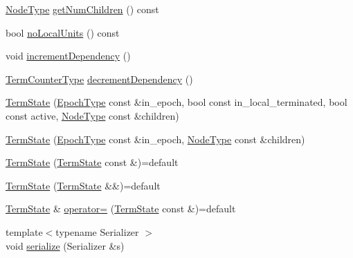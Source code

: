 \begin{DoxyCompactItemize}
\item 
\hyperlink{namespacevt_a866da9d0efc19c0a1ce79e9e492f47e2}{Node\+Type} \hyperlink{structvt_1_1term_1_1_term_state_ac3b42954f6cc609be8a40639e8a9a9a9}{get\+Num\+Children} () const
\item 
bool \hyperlink{structvt_1_1term_1_1_term_state_a6fd3b2a3c99002110ed7cfea8e30f021}{no\+Local\+Units} () const
\item 
void \hyperlink{structvt_1_1term_1_1_term_state_a109f0e5a978106ca6b8de01c5678b621}{increment\+Dependency} ()
\item 
\hyperlink{namespacevt_1_1term_a4fd378cdb0c36683afc1b3399d685f7f}{Term\+Counter\+Type} \hyperlink{structvt_1_1term_1_1_term_state_addc61edaf5b324db422a7e857890b314}{decrement\+Dependency} ()
\item 
\hyperlink{structvt_1_1term_1_1_term_state_a6949c80d5206b322eb0034ad17aa0ad0}{Term\+State} (\hyperlink{namespacevt_a81d11b28122d43bf9834577e4a06440f}{Epoch\+Type} const \&in\+\_\+epoch, bool const in\+\_\+local\+\_\+terminated, bool const active, \hyperlink{namespacevt_a866da9d0efc19c0a1ce79e9e492f47e2}{Node\+Type} const \&children)
\item 
\hyperlink{structvt_1_1term_1_1_term_state_a07b3f0ad915aee5a30d526e6172f3f90}{Term\+State} (\hyperlink{namespacevt_a81d11b28122d43bf9834577e4a06440f}{Epoch\+Type} const \&in\+\_\+epoch, \hyperlink{namespacevt_a866da9d0efc19c0a1ce79e9e492f47e2}{Node\+Type} const \&children)
\item 
\hyperlink{structvt_1_1term_1_1_term_state_a5a4f1285d03b0a2b1934e61bceb352c3}{Term\+State} (\hyperlink{structvt_1_1term_1_1_term_state}{Term\+State} const \&)=default
\item 
\hyperlink{structvt_1_1term_1_1_term_state_ae3b24cd9d0097422d6e1a35fc169fe4b}{Term\+State} (\hyperlink{structvt_1_1term_1_1_term_state}{Term\+State} \&\&)=default
\item 
\hyperlink{structvt_1_1term_1_1_term_state}{Term\+State} \& \hyperlink{structvt_1_1term_1_1_term_state_ac440f590ac59cb7c5b9560ca760fbc69}{operator=} (\hyperlink{structvt_1_1term_1_1_term_state}{Term\+State} const \&)=default
\item 
{\footnotesize template$<$typename Serializer $>$ }\\void \hyperlink{structvt_1_1term_1_1_term_state_adb41f4c46d2c270df3ccfcb479f9943d}{serialize} (Serializer \&s)
\end{DoxyCompactItemize}
